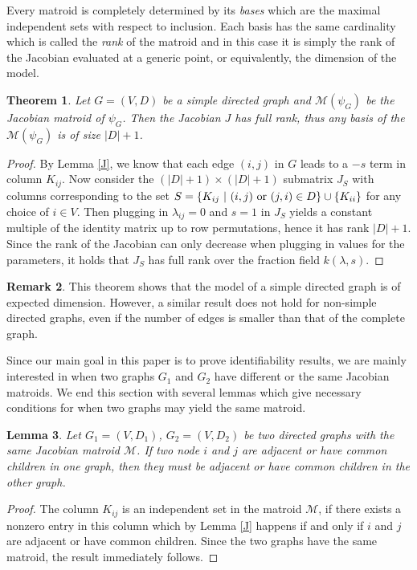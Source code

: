 \documentclass[12pt,reqno]{amsart}
\theoremstyle{plain}
\newtheorem{theorem}{Theorem}[section]
\newtheorem{lemma}[theorem]{Lemma}
\theoremstyle{definition}
\newtheorem{remark}[theorem]{Remark}
\newcommand{\cm}{\mathcal{M}}
\begin{document}
Every matroid is completely determined by its \emph{bases} which are the maximal independent sets with respect to inclusion. Each basis has the same cardinality which is called the \emph{rank} of the matroid and in this case it is simply the rank of the Jacobian evaluated at a generic point, or equivalently, the dimension of the model. 

\begin{theorem}\label{dim}
Let $G=(V,D)$ be a simple directed graph and $\mathcal{M}(\psi_G)$ be the Jacobian matroid of $\psi_G$. Then the Jacobian $J$ has full rank, thus any basis of the $\mathcal{M}(\psi_G)$ is of size $|D|+1$.
\end{theorem}

\begin{proof}
By Lemma \ref{J}, we know that each edge $(i,j)$ in $G$ leads to a $-s$ term in column $K_{ij}$. Now consider the $(|D|+1)\times(|D|+1)$ submatrix $J_S$ with columns corresponding to the set $S = \{K_{ij} ~|~ (i,j)\ {\rm or}\ (j,i) \in D\} \cup \{K_{ii}\}$ for any choice of $i \in V$. Then plugging in $\lambda_{ij} = 0$ and $s = 1$ in $J_S$ yields a constant multiple of the identity matrix up to row permutations, hence it has rank $|D|+1$. Since the rank of the Jacobian can only decrease when plugging in values for the parameters, it holds that $J_S$ has full rank over the fraction field $k(\lambda, s)$.  
\end{proof}

\begin{remark}
This theorem shows that the model of a simple directed graph is of expected dimension. However, a similar result does not hold for non-simple directed graphs, even if the number of edges is smaller than that of the complete graph.
\end{remark}

Since our main goal in this paper is to prove identifiability results, we are mainly interested in when two graphs $G_1$ and $G_2$ have different or the same Jacobian matroids. We end this section with several lemmas which give necessary conditions for when two graphs may yield the same matroid. 

\begin{lemma}\label{adj}
Let $G_1=(V,D_1)$, $G_2=(V,D_2)$ be two directed graphs with the same Jacobian matroid $\mathcal{M}$. If two node $i$ and $j$ are adjacent or have common children in one graph, then they must be adjacent or have common children in the other graph.
\end{lemma}
\begin{proof}
The column $K_{ij}$ is an independent set in the matroid $\cm$, if there exists a nonzero entry in this column which by Lemma \ref{J} happens if and only if $i$ and $j$ are adjacent or have common children. Since the two graphs have the same matroid, the result immediately follows. 
\end{proof}
\end{document}
